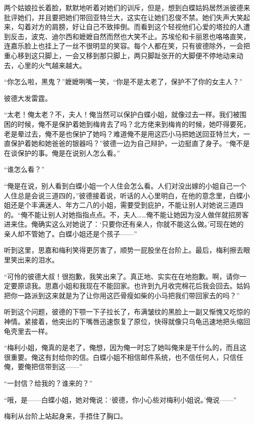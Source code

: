 \par 两个姑娘拉长着脸，默默地听着对她们的训斥，但是，想到白蝶姑妈居然派彼德来批评她们，并且要把她们带回亚特兰大，这实在让她们忍俊不禁。她们失声大笑起来，勾着对方的肩膀，好让自己不致摔倒。而看到这个轻视他们心爱的塔拉的人遭到反击，波克、迪尔西和嬷嬷自然而然也大笑不止。苏埃伦和卡丽恩也咯咯直笑，连嘉乐脸上也挂上了一丝不很明显的笑容。每个人都在笑，只有彼德除外，一会把重心移到这只脚上，一会又移到那只脚上，两只脚趾张开的大脚便不停地动来动去，心里的火气越来越大。
\par “你怎么啦，黑鬼？”嬷嬷咧嘴一笑，“你是不是太老了，保护不了你的女主人？”
\par 彼德大发雷霆。
\par “太老！俺太老？不，夫人！俺当然可以保护白蝶小姐，就像过去一样。我们被围困的时候，俺不是保护着她到梅肯去了吗？北方佬来到梅肯的时候，她吓得要死，老是晕过去，俺不是也保护了她吗？难道俺不是用这匹小马把她送回亚特兰大，一直保护着她和她爸爸的银器吗？”彼德一边为自己辩护，一边挺直了身子。“俺不是在谈保护的事。俺是在说别人怎么看。”
\par “谁怎么看？”
\par “俺是在说，别人看到白蝶小姐一个人住会怎么看。人们对没出嫁的小姐自己一个人住总是会说三道四的，”彼德接着说，听话的人心里明白，在他的意念里，白蝶小姐还是个丰满迷人、年方二八的小姐，需要受到庇护，不能让别人对她说三道四的。“俺不能让别人对她指指点点。不，夫人……俺不能让她因为没人做伴就招房客进来住。俺确实这么对她说了：‘只要你还有亲人，你就不能这么做。’可现在她的亲人却不管她了。白蝶小姐还是个孩子——”
\par 听到这里，思嘉和梅利笑得更厉害了，顺势一屁股坐在台阶上。最后，梅利擦去眼里笑出来的泪水。
\par “可怜的彼德大叔！很抱歉，我笑出来了。真正地、实实在在地抱歉。啊，请你一定要原谅我。思嘉小姐和我现在不能回家。也许到九月收完棉花后我会回去。姑妈把你一路派到这来就是为了让你用这匹骨瘦如柴的小马把我们带回家去的吗？”
\par 听到这个问题，彼德的下颚一下子拉长了，布满皱纹的黑脸上一副又惭愧又吃惊的神情。紧接着，他突出的下嘴唇迅速恢复了原位，快得就像只乌龟迅速地把头缩回龟壳里去一样。
\par “梅利小姐，俺真的是老了，俺想，因为俺一时忘了她叫俺来是干什么的，而且这很重要。俺这有封给你的信。白蝶小姐不相信邮件系统，也不信任何人，只信任俺，要俺把信带到这——”
\par “一封信？给我的？谁来的？”
\par “哦，是——白蝶小姐，她对俺说：‘彼德，你小心些对梅利小姐说。’俺说——”
\par 梅利从台阶上站起身来，手捂住了胸口。
